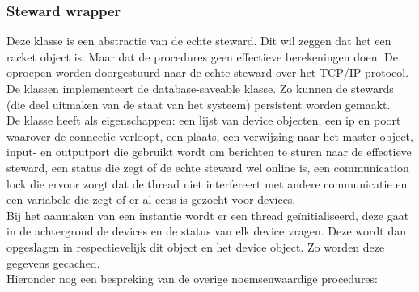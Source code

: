 \documentclass{article}
\begin{document}
\subsubsection{Steward wrapper}
\label{ssub:steward}
Deze klasse is een abstractie van de echte steward. Dit wil zeggen dat het een racket object is. Maar dat de procedures geen effectieve berekeningen doen. De oproepen worden doorgestuurd naar de echte steward over het TCP/IP protocol.\\
De klassen implementeert de database-saveable klasse. Zo kunnen de stewards (die deel uitmaken van de staat van het systeem) persistent worden gemaakt. \\
De klasse heeft als eigenschappen: een lijst van device objecten, een ip en poort waarover de connectie verloopt, een plaats, een verwijzing naar het master object, input- en outputport die gebruikt wordt om berichten te sturen naar de effectieve steward, een status die zegt of de echte steward wel online is, een communication lock die ervoor zorgt dat de thread niet interfereert met andere communicatie en een variabele die zegt of er al eens is gezocht voor devices.\\
Bij het aanmaken van een instantie wordt er een thread ge\"initialiseerd, deze gaat in de achtergrond de devices en de status van elk device vragen. Deze wordt dan opgeslagen in respectievelijk dit object en het device object. Zo worden deze gegevens gecached.\\
Hieronder nog een bespreking van de overige noemsenwaardige procedures:
\end{document}
